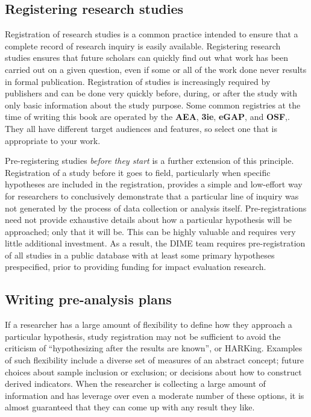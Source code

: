 \subsection{Registering research studies}

Registration of research studies is a common practice
intended to ensure that a complete record of research inquiry is easily available.
Registering research studies ensures that future scholars can quickly
find out what work has been carried out on a given question,
even if some or all of the work done never results in formal publication.
Registration of studies is increasingly required by publishers
and can be done very quickly before, during, or after the study
with only basic information about the study purpose.
Some common registries at the time of writing this book are operated by the \textbf{AEA},
\textbf{3ie},
\textbf{eGAP},
and \textbf{OSF},.
They all have different target audiences and features,
so select one that is appropriate to your work.

Pre-registering studies \textit{before they start} is a further extension of this principle.\cite{nosek2018preregistration}
Registration of a study before it goes to field,
particularly when specific hypotheses are included in the registration,
provides a simple and low-effort way for researchers
to conclusively demonstrate that a particular line of inquiry
was not generated by the process of data collection or analysis itself.
Pre-registrations need not provide exhaustive details about how
a particular hypothesis will be approached; only that it will be.
This can be highly valuable and requires very little additional investment.
As a result, the DIME team requires pre-registration of all studies
in a public database with at least some primary hypotheses prespecified,
prior to providing funding for impact evaluation research.

\subsection{Writing pre-analysis plans}

If a researcher has a large amount of flexibility
to define how they approach a particular hypothesis,
study registration may not be sufficient to avoid the criticism of
``hypothesizing after the results are known'', or HARKing.\cite{kerr1998harking}
Examples of such flexibility include a diverse set of measures of an abstract concept;
future choices about sample inclusion or exclusion;
or decisions about how to construct derived indicators.
When the researcher is collecting a large amount of information
and has leverage over even a moderate number of these options,
it is almost guaranteed that they can come up with any result they like.\cite{gelman2013garden}

